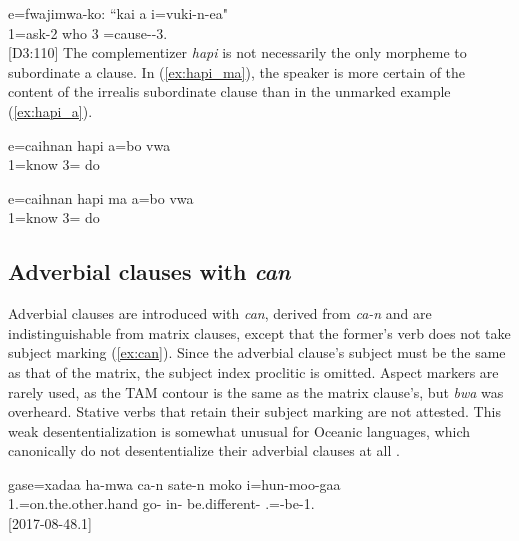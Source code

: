 \ea \label{ex:no hapi}\gll e=fwajimwa-ko: ``kai a i=vuki-n-ea"\\
 1=ask-2 who 3 =cause--3.\\
\glt {} {[D3:110]} 
\z
The complementizer \textit{hapi} is not necessarily the only morpheme to subordinate a clause. In (\ref{ex:hapi_ma}), the speaker is more certain of the content of the irrealis subordinate clause than in the unmarked example (\ref{ex:hapi_a}). 


\ea\label{ex:hapi_a}
\gll e=caihnan hapi a=bo vwa\\
 1=know  3= do\\
\glt {}
\z


\ea\label{ex:hapi_ma}
\gll e=caihnan hapi ma a=bo vwa\\
 1=know   3= do\\
\glt {}
\z 
 
\subsection{Adverbial clauses with \textit{can}}
\label{sec:adv_can}

Adverbial clauses are introduced with \textit{can}, derived from \textit{ca-n}  and are indistinguishable from matrix clauses, except that the former's verb does not take subject marking (\ref{ex:can}). Since the adverbial clause's subject must be the same as that of the matrix, the subject index proclitic is omitted. Aspect markers are rarely used, as the TAM contour is the same as the matrix clause's, but \textit{bwa}  was overheard. Stative verbs that retain their subject marking are not attested. This weak desententialization is somewhat unusual for Oceanic languages, which canonically do not desententialize their adverbial clauses at all \parencite[519]{ross_morphosyntactic_2004}. 

\ea
\label{ex:can}\gll gase=xadaa ha-mwa ca-n sate-n moko i=hun-moo-gaa\\
 1.=on.the.other.hand go- in- be.different-  .=-be-1.\\
\glt {} {[2017-08-48.1]}
\z

